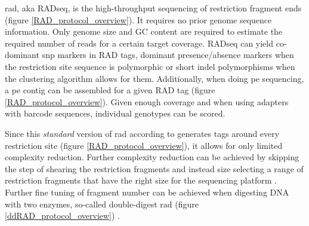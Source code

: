 \documentclass[a4paper,12pt,times,print,index,custombib,custommargin]{PhDThesisPSnPDF}\usepackage[]{graphicx}\usepackage[]{color}
\begin{document}
\gls{rad}, aka RADseq, is the high-throughput sequencing of restriction fragment ends (figure \ref{RAD_protocol_overview}). It requires no prior genome sequence information. Only genome size and GC content are required to estimate the required number of \glspl{read} for a certain target coverage. 
RADseq can yield co-dominant \gls{snp} markers in \glspl{RAD tag}, dominant presence/absence markers when the restriction site sequence is polymorphic or short \gls{indel} polymorphisms when the clustering algorithm allows for them. Additionally, when doing \gls{pe} sequencing, a \gls{pe} contig can be assembled for a given \gls{RAD tag} (figure \ref{RAD_protocol_overview}).
Given enough coverage and when using adapters with barcode sequences, individual genotypes can be scored.

Since this \emph{standard} version of \gls{rad} according to \cite{Baird2008} generates tags around every restriction site (figure \ref{RAD_protocol_overview}), it allows for only limited complexity reduction. Further complexity reduction can be achieved by skipping the step of shearing the restriction fragments and instead size selecting a range of restriction fragments that have the right size for the sequencing platform \citep{Andolfatto2011}. Further fine tuning of fragment number can be achieved when digesting DNA with two enzymes, so-called double-digest \gls{rad} (figure \ref{ddRAD_protocol_overview}) \citep{Peterson2012}.
\end{document}
